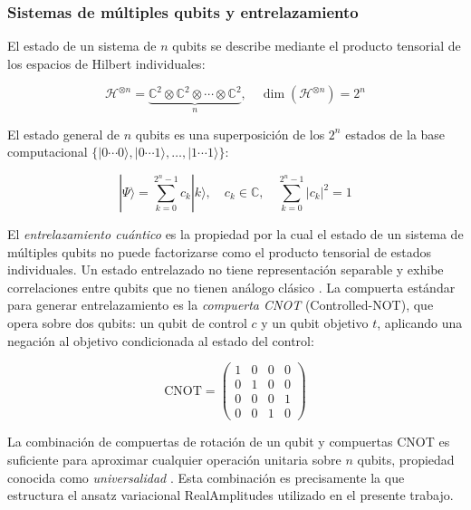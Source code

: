 
\subsubsection{Sistemas de múltiples qubits y entrelazamiento}

El estado de un sistema de $n$ qubits se describe mediante el producto tensorial de los espacios de Hilbert individuales:

\begin{equation}
    \mathcal{H}^{\otimes n} = 
    \underbrace{\mathbb{C}^2 \otimes \mathbb{C}^2 \otimes 
    \cdots \otimes \mathbb{C}^2}_{n}, 
    \quad \dim(\mathcal{H}^{\otimes n}) = 2^n
    \label{eq:tensor}
\end{equation}

\noindent El estado general de $n$ qubits es una superposición 
de los $2^n$ estados de la base computacional 
$\{|0\cdots0\rangle, |0\cdots1\rangle, \ldots, 
|1\cdots1\rangle\}$:

\begin{equation}
    |\Psi\rangle = \sum_{k=0}^{2^n - 1} c_k |k\rangle, 
    \quad c_k \in \mathbb{C}, 
    \quad \sum_{k=0}^{2^n-1} |c_k|^2 = 1
    \label{eq:multiQubit}
\end{equation}

El \textit{entrelazamiento cuántico} es la propiedad por la cual el estado de un sistema de múltiples qubits no puede factorizarse como el producto tensorial de estados individuales. Un estado entrelazado no tiene representación separable y exhibe correlaciones entre qubits que no tienen análogo clásico \cite{nielsen2010quantum}. La compuerta estándar para generar entrelazamiento es la \textit{compuerta CNOT} (Controlled-NOT), que opera sobre dos qubits: un qubit de control $c$ y un qubit objetivo $t$, aplicando una negación al objetivo condicionada al estado del control:

\begin{equation}
    \text{CNOT} = 
    \begin{pmatrix} 
        1 & 0 & 0 & 0 \\ 
        0 & 1 & 0 & 0 \\ 
        0 & 0 & 0 & 1 \\ 
        0 & 0 & 1 & 0 
    \end{pmatrix}
    \label{eq:cnot}
\end{equation}

\noindent La combinación de compuertas de rotación de un qubit 
y compuertas CNOT es suficiente para aproximar cualquier 
operación unitaria sobre $n$ qubits, propiedad conocida como 
\textit{universalidad} \cite{nielsen2010quantum}. Esta 
combinación es precisamente la que estructura el ansatz 
variacional RealAmplitudes utilizado en el presente trabajo.
